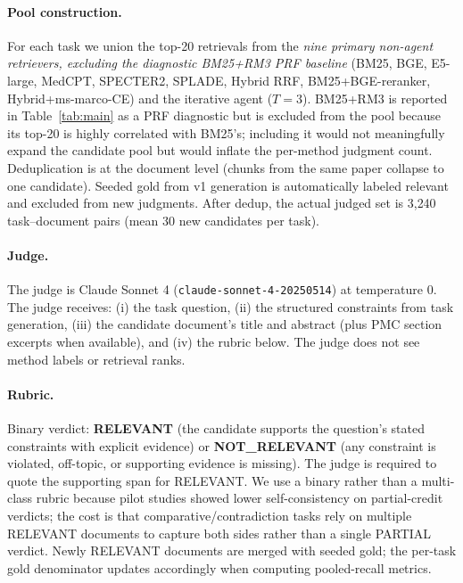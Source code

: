 \documentclass{article}
\begin{document}
\paragraph{Pool construction.} For each task we union the top-20 retrievals from the \emph{nine primary non-agent retrievers, excluding the diagnostic BM25+RM3 PRF baseline} (BM25, BGE, E5-large, MedCPT, SPECTER2, SPLADE, Hybrid RRF, BM25+BGE-reranker, Hybrid+ms-marco-CE) and the iterative agent ($T{=}3$). BM25+RM3 is reported in Table~\ref{tab:main} as a PRF diagnostic but is excluded from the pool because its top-20 is highly correlated with BM25's; including it would not meaningfully expand the candidate pool but would inflate the per-method judgment count. Deduplication is at the document level (chunks from the same paper collapse to one candidate). Seeded gold from v1 generation is automatically labeled relevant and excluded from new judgments. After dedup, the actual judged set is 3{,}240 task--document pairs (mean 30 new candidates per task).

\paragraph{Judge.} The judge is Claude Sonnet 4 (\texttt{claude-sonnet-4-20250514}) at temperature 0. The judge receives: (i) the task question, (ii) the structured constraints from task generation, (iii) the candidate document's title and abstract (plus PMC section excerpts when available), and (iv) the rubric below. The judge does not see method labels or retrieval ranks.

\paragraph{Rubric.} Binary verdict: \textbf{RELEVANT} (the candidate supports the question's stated constraints with explicit evidence) or \textbf{NOT\_RELEVANT} (any constraint is violated, off-topic, or supporting evidence is missing). The judge is required to quote the supporting span for RELEVANT. We use a binary rather than a multi-class rubric because pilot studies showed lower self-consistency on partial-credit verdicts; the cost is that comparative/contradiction tasks rely on multiple RELEVANT documents to capture both sides rather than a single PARTIAL verdict. Newly RELEVANT documents are merged with seeded gold; the per-task gold denominator updates accordingly when computing pooled-recall metrics.
\end{document}
